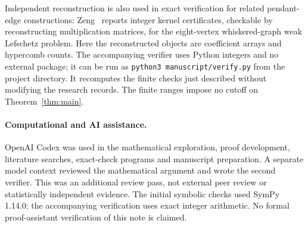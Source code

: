\documentclass[11pt]{article}
\begin{document}
Independent reconstruction is also used in exact verification for related
pendant-edge constructions: Zeng~\cite{ZengWhiskered} reports integer
kernel certificates, checkable by reconstructing multiplication matrices,
for the eight-vertex whiskered-graph weak Lefschetz problem. Here the
reconstructed objects are coefficient arrays and hypercomb counts.
The accompanying verifier uses Python integers and no external package;
it can be run as \texttt{python3 manuscript/verify.py} from the project
directory. It recomputes the finite checks just described without modifying
the research records. The finite ranges impose no cutoff on
Theorem~\ref{thm:main}.

\paragraph{Computational and AI assistance.}
OpenAI Codex was used in the mathematical exploration, proof development,
literature searches, exact-check programs and manuscript preparation.
A separate model context reviewed the mathematical argument and wrote the
second verifier. This was an additional review pass, not external peer review
or statistically independent evidence. The initial symbolic checks used
SymPy 1.14.0; the accompanying verification uses exact integer arithmetic.
No formal proof-assistant verification of this note is claimed.



\end{document}
